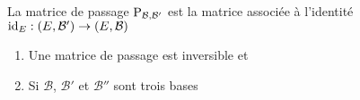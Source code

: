 \begin{frame}
\begin{proposition}
La matrice de passage $\mathop{\text{P}}\nolimits_{\mathcal{B},\mathcal{B}'}$
est la matrice associée à l'identité $\mathop{\text{id}}\nolimits_E :  (E, \mathcal{B}') \to (E,\mathcal{B})$

\end{proposition}

\pause

\begin{proposition}
\label{prop:chgtbase}
\begin{enumerate}
  \item Une matrice de passage est inversible et
  
 \bigskip
 \pause
 
  \item Si $\mathcal{B}$, $\mathcal{B}'$ et $\mathcal{B}''$ sont trois bases
\end{enumerate}
\end{proposition}


\end{frame}


